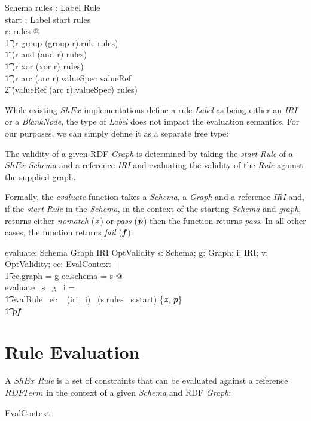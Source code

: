 \documentclass[fuzz]{llncs}
\def\entryFor{\cdot}
\def\pass{\textbf{\textit{p}}}
\def\fail{\textbf{\textit{f}}}
\def\nomatch{\textbf{\textit{z}}}
\def\zc{\textit}
\begin{document}
\begin{schema}{Schema}
   rules : Label \pfun Rule \\
   start : Label
\where
   start \in \dom rules \\
\forall r: \ran rules @ \\
\t1 (r \in \ran group \implies (group \entryFor r).rule \in \dom rules) \land \\
\t1 (r \in \ran and \implies \ran (and \entryFor r) \subseteq \dom rules) \land \\
\t1 (r \in \ran xor \implies \ran (xor \entryFor r) \subseteq \dom rules) \land \\ 
\t1 (r \in \ran arc \land (arc \entryFor r).valueSpec \in \ran valueRef \implies \\
\t2 (valueRef \entryFor (arc \entryFor r).valueSpec) \in \dom rules)
\end{schema}


While existing $ShEx$ implementations define a rule \zc{Label} as being either an \zc{IRI} or
a \zc{BlankNode}, the type of \zc{Label} does not impact the evaluation semantics.  For our 
purposes, we can simply define it as a separate free type:
\begin{zed}
[Label]
\end{zed}

The validity of a given RDF \zc{Graph} is determined by taking the \zc{start} \zc{Rule} of a
$ShEx$ \zc{Schema} and a reference \zc{IRI} and evaluating the validity of the \zc{Rule} against the supplied graph. 

Formally, the \zc{evaluate} function takes a \zc{Schema}, a \zc{Graph} and a reference \zc{IRI}
and, if the \zc{start} \zc{Rule} in the \zc{Schema}, 
in the context of the starting \zc{Schema} and \zc{graph}, returns either \zc{nomatch} 
($\nomatch$) or \zc{pass} ($\pass$) then the function returns \zc{pass}.  In all other cases,
the function returns \zc{fail} ($\fail$).
\begin{gendef}
   evaluate: Schema \fun Graph \fun IRI \fun OptValidity
\where
   \forall s: Schema; g: Graph; i: IRI; v: OptValidity; ec: EvalContext | \\
\t1 ec.graph = g \land ec.schema = s @ \\
   evaluate ~s ~g ~i = \\
\t1 \IF evalRule ~ec ~ (iri~ i)~ (s.rules~ s.start) \in \{\nomatch, \pass\} \\
\t1 \THEN \pass \ELSE \fail
\end{gendef}

\section{Rule Evaluation}
A $ShEx$ \zc{Rule} is a set of constraints that can be evaluated against a reference ${RDFTerm}$
 in the context of a given \zc{Schema} and RDF \zc{Graph}:
\begin{zed}
EvalContext  \\
\end{zed}
\end{document}
